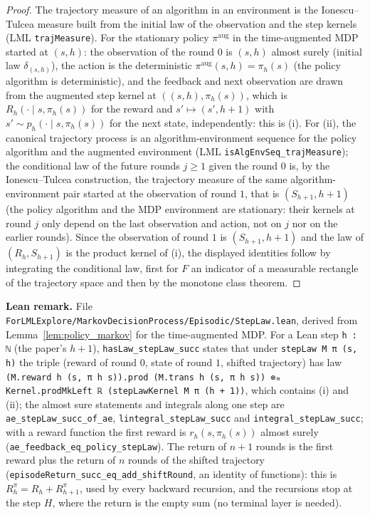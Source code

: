 \begin{proof}
\leanok
The trajectory measure of an algorithm in an environment is the Ionescu--Tulcea measure built
from the initial law of the observation and the step kernels (LML \texttt{trajMeasure}). For the
stationary policy $\pi^{\mathrm{aug}}$ in the time-augmented MDP started at $(s, h)$: the
observation of the round $0$ is $(s, h)$ almost surely (initial law $\delta_{(s, h)}$), the action
is the deterministic $\pi^{\mathrm{aug}}(s, h) = \pi_h(s)$ (the policy algorithm is deterministic),
and the feedback and next observation are drawn from the augmented step kernel at
$((s, h), \pi_h(s))$,
which is $R_h(\cdot \mid s, \pi_h(s))$ for the reward and $s' \mapsto (s', h + 1)$ with
$s' \sim p_h(\cdot \mid s, \pi_h(s))$ for the next state, independently: this is (i). For (ii), the
canonical trajectory process is an algorithm-environment sequence for the policy algorithm and
the augmented environment (LML \texttt{isAlgEnvSeq\_trajMeasure}); the conditional law of the
future rounds $j \ge 1$ given the round $0$ is, by the Ionescu--Tulcea construction, the
trajectory measure of the same algorithm-environment pair started at the observation of round
$1$, that is $(S_{h+1}, h + 1)$ (the policy algorithm and the MDP environment are stationary:
their kernels at round $j$ only depend on the last observation and action, not on $j$ nor on
the earlier rounds). Since the observation of round $1$ is $(S_{h+1}, h + 1)$ and the law of
$(R_h, S_{h+1})$ is the product kernel of (i), the displayed identities follow by integrating
the conditional law, first for $F$ an indicator of a measurable rectangle of the trajectory
space and then by the monotone class theorem.
\end{proof}

\textbf{Lean remark.} File \texttt{ForLMLExplore/MarkovDecisionProcess/Episodic/StepLaw.lean}, derived from
Lemma~\ref{lem:policy_markov} for the time-augmented MDP. For a Lean step \texttt{h : ℕ} (the
paper's $h + 1$), \texttt{hasLaw\_stepLaw\_succ} states that under \texttt{stepLaw M π (s, h)}
the triple (reward of round $0$, state of round $1$, shifted trajectory) has law
\texttt{(M.reward h (s, π h s)).prod (M.trans h (s, π h s)) ⊗ₘ Kernel.prodMkLeft ℝ (stepLawKernel M π (h + 1))},
which contains (i) and (ii); the almost sure statements and integrals along one step are
\texttt{ae\_stepLaw\_succ\_of\_ae}, \texttt{lintegral\_stepLaw\_succ} and
\texttt{integral\_stepLaw\_succ}; with a reward function the first reward is
$r_h(s, \pi_h(s))$ almost surely (\texttt{ae\_feedback\_eq\_policy\_stepLaw}). The return of
$n + 1$ rounds is the first reward plus the return of $n$ rounds of the shifted trajectory
(\texttt{episodeReturn\_succ\_eq\_add\_shiftRound}, an identity of functions): this is
$R^\pi_h = R_h + R^\pi_{h+1}$, used by every backward recursion, and the recursions stop at the
step $H$, where the return is the empty sum (no terminal layer is needed).

